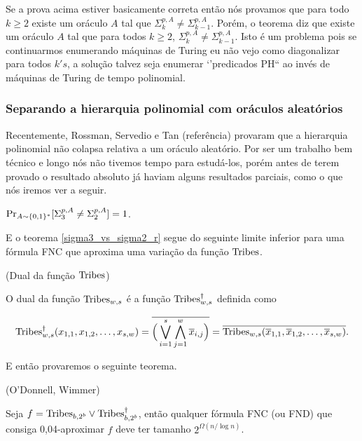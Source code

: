 \color{red}

Se a prova acima estiver basicamente correta então nós provamos que para todo $k \geq 2$ existe um oráculo $A$ tal que $\Sigma_{k}^{p, A} \neq \Sigma_{k - 1}^{p, A}$. Porém, o teorema diz que existe um oráculo $A$ tal que para todos $k \geq 2$, $\Sigma_{k}^{p, A} \neq \Sigma_{k - 1}^{p, A}$. Isto é um problema pois se continuarmos enumerando máquinas de Turing eu não vejo como diagonalizar para todos $k's$, a solução talvez seja enumerar `'predicados PH`` ao invés de máquinas de Turing de tempo polinomial.

\color{black}

\subsubsection{Separando a hierarquia polinomial com oráculos aleatórios}

Recentemente, Rossman, Servedio e Tan (referência) provaram que a hierarquia polinomial não colapsa relativa a um oráculo aleatório. Por ser um trabalho bem técnico e longo nós não tivemos tempo para estudá-los, porém antes de terem provado o resultado absoluto já haviam alguns resultados parciais, como o que nós iremos ver a seguir.

\begin{teo} \label{sigma3_vs_sigma2_r}
	$\Pr_{A \sim \{0, 1\}^{*}}[\Sigma_{3}^{p, A} \neq \Sigma_{2}^{p, A}] = 1$.
\end{teo}

E o teorema \ref{sigma3_vs_sigma2_r} segue do seguinte limite inferior para uma fórmula FNC que aproxima uma variação da função $\text{Tribes}$.

\begin{defi} (Dual da função $\text{Tribes}$)

O dual da função $\text{Tribes}_{w, s}$ é a função $\text{Tribes}_{w, s}^{\dagger}$ definida como

\begin{equation*}
	\text{Tribes}_{w, s}^{\dagger}(x_{1, 1}, x_{1,2}, \dots, x_{s, w})  = \overline{\Big(\bigvee_{i = 1}^{s}\bigwedge_{j = 1}^{w} \overline{x}_{i, j}\Big)} = \overline{\text{Tribes}_{w, s}(\overline{x}_{1, 1}, \overline{x}_{1, 2}, \dots, \overline{x}_{s, w})}.
\end{equation*}

\end{defi}

E então provaremos o seguinte teorema.

\begin{teo} (O'Donnell, Wimmer) \label{odonnell_wimmer}

Seja $f = \text{Tribes}_{b, 2^{b}} \lor \text{Tribes}_{b, 2^{b}}^{\dagger}$, então qualquer fórmula FNC (ou FND) que consiga 0,04-aproximar $f$ deve ter tamanho $2^{\Omega(n/\log n)}$.

\end{teo}

